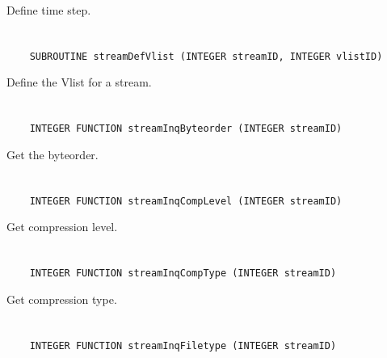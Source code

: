 Define time step.


\section*{\tt {}}

\begin{verbatim}
    SUBROUTINE streamDefVlist (INTEGER streamID, INTEGER vlistID)
\end{verbatim}

Define the Vlist for a stream.


\section*{\tt {}}

\begin{verbatim}
    INTEGER FUNCTION streamInqByteorder (INTEGER streamID)
\end{verbatim}

Get the byteorder.


\section*{\tt {}}

\begin{verbatim}
    INTEGER FUNCTION streamInqCompLevel (INTEGER streamID)
\end{verbatim}

Get compression level.


\section*{\tt {}}

\begin{verbatim}
    INTEGER FUNCTION streamInqCompType (INTEGER streamID)
\end{verbatim}

Get compression type.


\section*{\tt {}}

\begin{verbatim}
    INTEGER FUNCTION streamInqFiletype (INTEGER streamID)
\end{verbatim}

